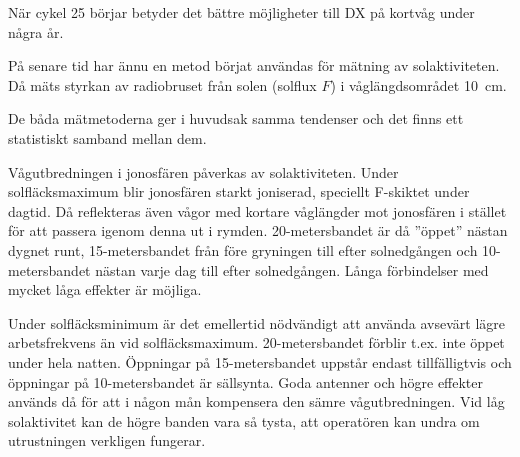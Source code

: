 När cykel 25 börjar betyder det bättre möjligheter till DX på kortvåg under
några år.

På senare tid har ännu en metod börjat användas för mätning av solaktiviteten.
Då mäts styrkan av radiobruset från solen (solflux \(F\)) i våglängdsområdet 10~cm.

De båda mätmetoderna ger i huvudsak samma tendenser och det finns ett
statistiskt samband mellan dem.

Vågutbredningen i jonosfären påverkas av solaktiviteten.
Under solfläcksmaximum blir jonosfären starkt joniserad, speciellt F-skiktet
under dagtid.
Då reflekteras även vågor med kortare våglängder mot jonosfären i stället för
att passera igenom denna ut i rymden.
20-metersbandet är då ''öppet'' nästan dygnet runt, 15-metersbandet från före
gryningen till efter solnedgången och 10-metersbandet nästan varje dag till
efter solnedgången.
Långa förbindelser med mycket låga effekter är möjliga.

Under solfläcksminimum är det emellertid nödvändigt att använda avsevärt lägre
arbetsfrekvens än vid solfläcksmaximum.
20-metersbandet förblir t.ex. inte öppet under hela natten.
Öppningar på 15-metersbandet uppstår endast tillfälligtvis och öppningar på
10-metersbandet är sällsynta.
Goda antenner och högre effekter används då för att i någon mån kompensera den
sämre vågutbredningen.
Vid låg solaktivitet kan de högre banden vara så tysta, att operatören kan
undra om utrustningen verkligen fungerar.
